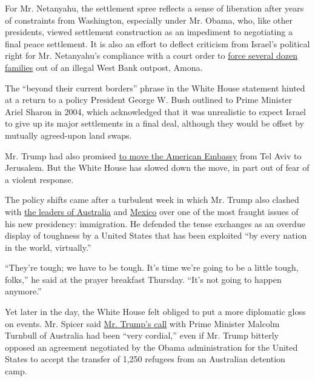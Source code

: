 For Mr. Netanyahu, the settlement spree reflects a sense of liberation
after years of constraints from Washington, especially under Mr. Obama,
who, like other presidents, viewed settlement construction as an
impediment to negotiating a final peace settlement. It is also an effort
to deflect criticism from Israel's political right for Mr. Netanyahu's
compliance with a court order to
\href{https://www.nytimes.com/video/world/middleeast/100000004906367/jewish-settlers-resist-outpost-evacuation.html}{force
several dozen families} out of an illegal West Bank outpost, Amona.

The ``beyond their current borders'' phrase in the White House statement
hinted at a return to a policy President George W. Bush outlined to
Prime Minister Ariel Sharon in 2004, which acknowledged that it was
unrealistic to expect Israel to give up its major settlements in a final
deal, although they would be offset by mutually agreed-upon land swaps.

Mr. Trump had also promised
\href{https://www.nytimes.com/2017/01/19/world/middleeast/donald-trump-jerusalem-embassy-israel-palestinians.html}{to
move the American Embassy} from Tel Aviv to Jerusalem. But the White
House has slowed down the move, in part out of fear of a violent
response.

The policy shifts came after a turbulent week in which Mr. Trump also
clashed with
\href{https://www.nytimes.com/2017/02/02/world/australia/donald-trump-malcolm-turnbull-refugees.html}{the
leaders of Australia} and
\href{https://www.nytimes.com/2017/01/26/world/americas/mexico-pena-nieto-donald-trump.html}{Mexico}
over one of the most fraught issues of his new presidency: immigration.
He defended the tense exchanges as an overdue display of toughness by a
United States that has been exploited ``by every nation in the world,
virtually.''

``They're tough; we have to be tough. It's time we're going to be a
little tough, folks,'' he said at the prayer breakfast Thursday. ``It's
not going to happen anymore.''

Yet later in the day, the White House felt obliged to put a more
diplomatic gloss on events. Mr. Spicer said
\href{https://www.nytimes.com/2017/02/02/us/politics/us-australia-trump-turnbull.html}{Mr.
Trump's call} with Prime Minister Malcolm Turnbull of Australia had been
``very cordial,'' even if Mr. Trump bitterly opposed an agreement
negotiated by the Obama administration for the United States to accept
the transfer of 1,250 refugees from an Australian detention camp.

